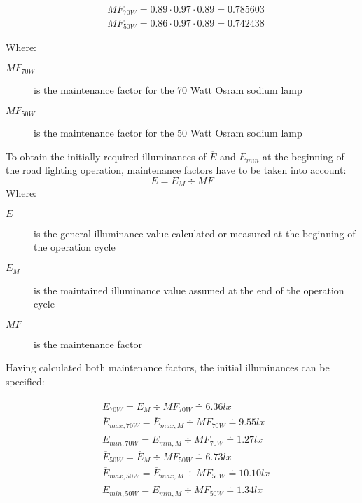 \begin{align}
&MF_{70W} = 0.89 \cdot 0.97 \cdot 0.89 = 0.785603\\
&MF_{50W} = 0.86 \cdot 0.97 \cdot 0.89 = 0.742438
\end{align}

Where:
\begin{description}
	\item[$MF_{70W}$] is the maintenance factor for the 70 Watt Osram sodium lamp
	\item[$MF_{50W}$] is the maintenance factor for the 50 Watt Osram sodium lamp
\end{description}

To obtain the initially required illuminances of $\overline{E}$ and $E_{min}$ at the beginning of the road lighting operation, maintenance factors have to be taken into account:
\begin{equation}
E = E_{M} \div MF
\end{equation}
Where:
\begin{description}
	\item[$E$] is the general illuminance value calculated or measured at the beginning of the operation cycle
	\item[$E_{M}$] is the maintained illuminance value assumed at the end of the operation cycle
	\item[$MF$] is the maintenance factor
\end{description}

Having calculated both maintenance factors, the initial illuminances can be specified:

\begin{align}
&\overline{E}_{70W} = \overline{E}_{M} \div MF_{70W} \doteq 6.36 lx\\
&\overline{E}_{max,70W} = \overline{E}_{max,M} \div MF_{70W} \doteq 9.55 lx\\
&\overline{E}_{min,70W} = \overline{E}_{min,M} \div MF_{70W} \doteq 1.27 lx\\
&\overline{E}_{50W} = \overline{E}_{M} \div MF_{50W} \doteq 6.73 lx\\
&\overline{E}_{max,50W} = \overline{E}_{max,M} \div MF_{50W} \doteq 10.10 lx\\
&\overline{E}_{min,50W} = \overline{E}_{min,M} \div MF_{50W} \doteq 1.34 lx
\end{align}

